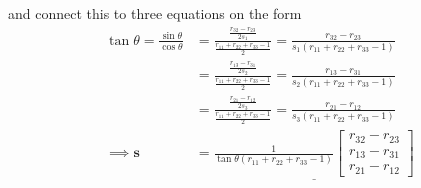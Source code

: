 \documentclass[a4paper]{scrartcl}
\begin{document}
and connect this to three equations on the form
\begin{equation}
    \begin{aligned}
        \tan\theta = \frac{\sin\theta}{\cos\theta} &= \frac{\tfrac{r_{32} - r_{23}}{2s_1}}{\tfrac{r_{11} + r_{22} + r_{33} -1}{2}} = \frac{r_{32} - r_{23}}{s_1(r_{11} + r_{22} + r_{33} -1)}\\
        &= \frac{\tfrac{r_{13} - r_{31}}{2s_2}}{\tfrac{r_{11} + r_{22} + r_{33} -1}{2}} = \frac{r_{13} - r_{31}}{s_2(r_{11} + r_{22} + r_{33} -1)}\\
        &= \frac{\tfrac{r_{21} - r_{12}}{2s_3}}{\tfrac{r_{11} + r_{22} + r_{33} -1}{2}} = \frac{r_{21} - r_{12}}{s_3(r_{11} + r_{22} + r_{33} -1)}\\
        \implies \bm{s} &= \underline{\frac{1}{\tan\theta(r_{11} + r_{22} + r_{33} -1)} \begin{bmatrix}
            r_{32} - r_{23}\\
            r_{13} - r_{31}\\
            r_{21} - r_{12}
        \end{bmatrix}}
    \end{aligned}
\end{equation}
\end{document}
